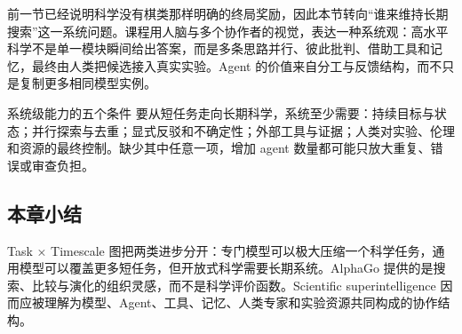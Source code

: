 前一节已经说明科学没有棋类那样明确的终局奖励，因此本节转向“谁来维持长期搜索”这一系统问题。课程用人脑与多个协作者的视觉，表达一种系统观：高水平科学不是单一模块瞬间给出答案，而是多条思路并行、彼此批判、借助工具和记忆，最终由人类把候选接入真实实验。Agent 的价值来自分工与反馈结构，而不只是复制更多相同模型实例。


\begin{importantbox}{系统级能力的五个条件}
要从短任务走向长期科学，系统至少需要：持续目标与状态；并行探索与去重；显式反驳和不确定性；外部工具与证据；人类对实验、伦理和资源的最终控制。缺少其中任意一项，增加 agent 数量都可能只放大重复、错误或审查负担。
\end{importantbox}


\subsection{本章小结}

Task × Timescale 图把两类进步分开：专门模型可以极大压缩一个科学任务，通用模型可以覆盖更多短任务，但开放式科学需要长期系统。AlphaGo 提供的是搜索、比较与演化的组织灵感，而不是科学评价函数。Scientific superintelligence 因而应被理解为模型、Agent、工具、记忆、人类专家和实验资源共同构成的协作结构。


